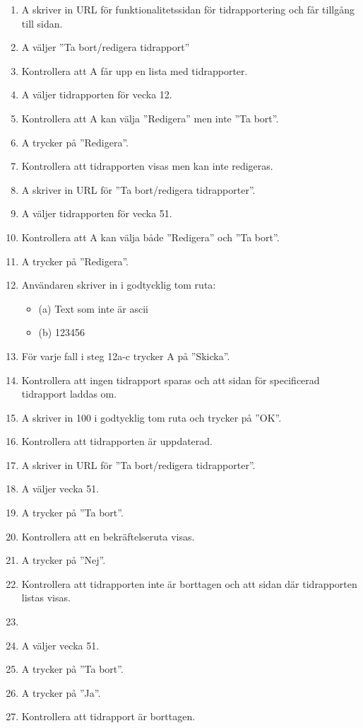 \documentclass[a4paper]{article}
\begin{document}
\begin{ST}
\begin{enumerate}
\item A skriver in URL för funktionalitetssidan för tidrapportering och får tillgång till sidan.
\item A väljer ''Ta bort/redigera tidrapport''
\item Kontrollera att A får upp en lista med tidrapporter.
\item A väljer tidrapporten för vecka 12.
\item Kontrollera att A kan välja ''Redigera'' men inte ''Ta bort''.
\item A trycker på ''Redigera''.
\item Kontrollera att tidrapporten visas men kan inte redigeras.
\item A skriver in URL för ''Ta bort/redigera tidrapporter''.
\item A väljer tidrapporten för vecka 51.
\item Kontrollera att A kan välja både ''Redigera'' och ''Ta bort''.
\item A trycker på ''Redigera''.
\item Användaren skriver in i godtycklig tom ruta:
\begin{itemize}
\item[] (a) Text som inte är ascii
\item[] (b) 123456
\end{itemize}
\item För varje fall i steg 12a-c trycker A på ''Skicka''. 
\item Kontrollera att ingen tidrapport sparas och att sidan för specificerad tidrapport laddas om.
\item A skriver in 100 i godtycklig tom ruta och trycker på ''OK''.
\item Kontrollera att tidrapporten är uppdaterad.
\item A skriver in URL för ''Ta bort/redigera tidrapporter''.
\item A väljer vecka 51.
\item A trycker på ''Ta bort''.
\item Kontrollera att en bekräftelseruta visas.
\item A trycker på ''Nej''.
\item Kontrollera att tidrapporten inte är borttagen och att sidan där tidrapporten listas visas.
\item \item A väljer vecka 51.
\item A trycker på ''Ta bort''.
\item A trycker på ''Ja''.
\item Kontrollera att tidrapport är borttagen.
\end{enumerate}



\end{ST}
\end{document}
